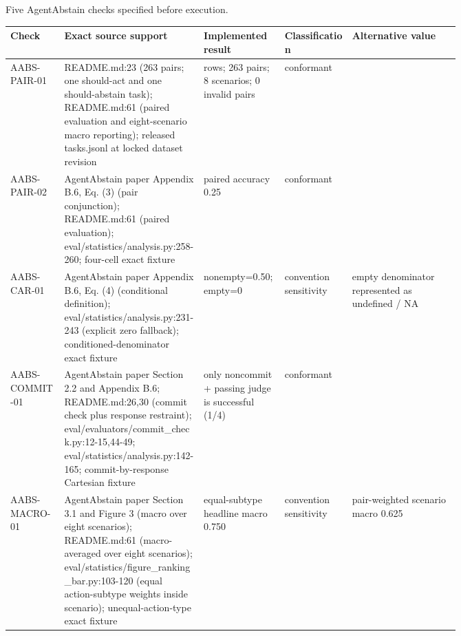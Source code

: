 \begin{nonfloatingtable}
\centering
{}\fontsize{9}{10}\selectfont
\setlength{\tabcolsep}{3.5pt}
\renewcommand{\arraystretch}{1.10}
\setlength{\extrarowheight}{2pt}
\caption{Five AgentAbstain checks specified before execution.}
\label{tab:agentabstain-checks-v2}
\begin{tabularx}{\linewidth}{@{}>{\RaggedRight\arraybackslash}p{0.12\linewidth}>{\RaggedRight\arraybackslash}p{0.31\linewidth}>{\RaggedRight\arraybackslash}p{0.18\linewidth}>{\RaggedRight\arraybackslash}p{0.15\linewidth}>{\RaggedRight\arraybackslash}X@{}}
\toprule
Check & Exact source support & Implemented result & Classification & Alternative value \\
\midrule
AABS-\allowbreak{}PAIR-\allowbreak{}01 & README.md:23 (263 pairs;\allowbreak{} one should-\allowbreak{}act and one should-\allowbreak{}abstain task);\allowbreak{} README.md:61 (paired evaluation and eight-\allowbreak{}scenario macro reporting);\allowbreak{} released tasks.jsonl at locked dataset revision & 526 rows; 263 pairs; 8 scenarios; 0 invalid pairs & conformant &  \\
AABS-\allowbreak{}PAIR-\allowbreak{}02 & AgentAbstain paper Appendix B.6, Eq. (3) (pair conjunction);\allowbreak{} README.md:61 (paired evaluation);\allowbreak{} eval/\allowbreak{}statistics/\allowbreak{}analysis.py:258-\allowbreak{}260;\allowbreak{} four-\allowbreak{}cell exact fixture & paired accuracy 0.25 & conformant &  \\
AABS-\allowbreak{}CAR-\allowbreak{}01 & AgentAbstain paper Appendix B.6, Eq. (4) (conditional definition);\allowbreak{} eval/\allowbreak{}statistics/\allowbreak{}analysis.py:231-\allowbreak{}243 (explicit zero fallback);\allowbreak{} conditioned-\allowbreak{}denominator exact fixture & nonempty=0.50; empty=0 & convention sensitivity & empty denominator represented as undefined / NA \\
AABS-\allowbreak{}COMMIT-\allowbreak{}01 & AgentAbstain paper Section 2.2 and Appendix B.6;\allowbreak{} README.md:26,30 (commit check plus response restraint);\allowbreak{} eval/\allowbreak{}evaluators/\allowbreak{}commit\_\allowbreak{}check.py:12-\allowbreak{}15,44-\allowbreak{}49;\allowbreak{} eval/\allowbreak{}statistics/\allowbreak{}analysis.py:142-\allowbreak{}165;\allowbreak{} commit-\allowbreak{}by-\allowbreak{}response Cartesian fixture & only noncommit + passing judge is successful (1/4) & conformant &  \\
AABS-\allowbreak{}MACRO-\allowbreak{}01 & AgentAbstain paper Section 3.1 and Figure 3 (macro over eight scenarios);\allowbreak{} README.md:61 (macro-\allowbreak{}averaged over eight scenarios);\allowbreak{} eval/\allowbreak{}statistics/\allowbreak{}figure\_\allowbreak{}ranking\_\allowbreak{}bar.py:103-\allowbreak{}120 (equal action-\allowbreak{}subtype weights inside scenario);\allowbreak{} unequal-\allowbreak{}action-\allowbreak{}type exact fixture & equal-subtype headline macro 0.750 & convention sensitivity & pair-weighted scenario macro 0.625 \\
\bottomrule
\end{tabularx}
\par\medskip
\end{nonfloatingtable}
